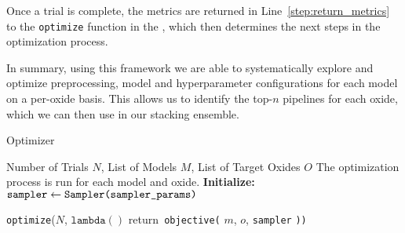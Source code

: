 Once a trial is complete, the metrics are returned in Line~\ref{step:return_metrics} to the \texttt{optimize} function in the , which then determines the next steps in the optimization process.

In summary, using this framework we are able to systematically explore and optimize preprocessing, model and hyperparameter configurations for each model on a per-oxide basis.
This allows us to identify the top-$n$ pipelines for each oxide, which we can then use in our stacking ensemble.

\begin{algorithm}
\caption{Optimizer}
\label{alg:study_function}
\begin{algorithmic}[1]
\Require Number of Trials $N$, List of Models $M$, List of Target Oxides $O$ \label{step:initialize_run_process}
\Ensure The optimization process is run for each model and oxide.
\State \textbf{Initialize:} $\texttt{sampler} \gets \texttt{Sampler(\texttt{sampler\_params})}$ \label{step:initialize_sampler}

 \label{step:oxide_loop}
     \label{step:model_loop}
        \State \texttt{optimize}($N$, $\texttt{lambda}()$ \label{step:optimize_objective}
            \State \hspace{1.5em} return\texttt{ objective(}
                \State \hspace{2.5em} $m$, \label{step:model_param_study}
                \State \hspace{2.5em} $o$, \label{step:oxide_param_study}
                \State \hspace{2.5em} \texttt{sampler} \label{step:sampler_param_study}
            \State \texttt{))} \label{step:optimize_combined_objective}
    \EndFor
\EndFor

\end{algorithmic}
\end{algorithm}

